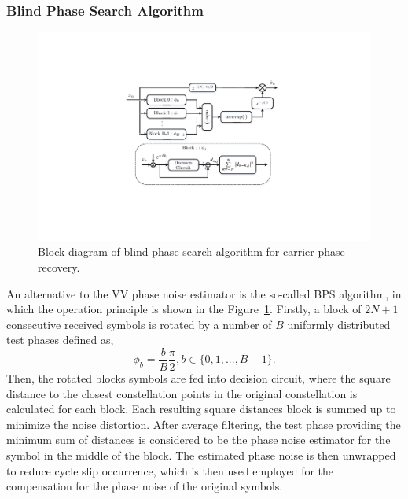 \begin{refsection}
\subsubsection{Blind Phase Search Algorithm}
\begin{figure}[h!]
    \centering
    \includegraphics[width=12cm]{./sdf/dsp_laser_phase_compensation/figures/bps_diagram.pdf}
    \caption{Block diagram of blind phase search algorithm for carrier phase recovery.}
    \label{fig_BPSdiagram}
\end{figure}
An alternative to the VV phase noise estimator is the so-called BPS algorithm, in which the operation principle is shown in the Figure~\ref{fig_BPSdiagram}. Firstly, a block of $2N+1$ consecutive received symbols is rotated by a number of $B$ uniformly distributed test phases defined as,
\begin{equation}
    	\phi_{b} = \frac{b}{B}\frac{\pi}{2}, b \in\{0,1,...,B-1\}.
    \label{eq_phaseNoise}
\end{equation}
Then, the rotated blocks symbols are fed into decision circuit, where the square distance to the closest constellation points in the original constellation is calculated for each block. Each resulting square distances block is summed up to minimize the noise distortion. After average filtering, the test phase providing the minimum sum of distances is considered to be the phase noise estimator for the symbol in the middle of the block. The estimated phase noise is then unwrapped to reduce cycle slip occurrence, which is then used employed for the compensation for the phase noise of the original symbols.


\end{refsection}

